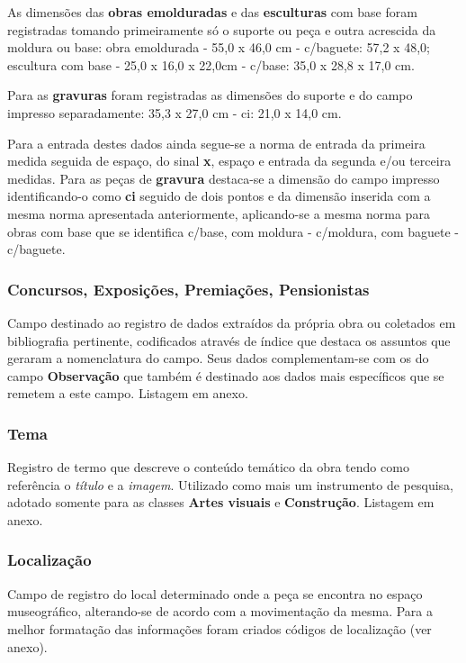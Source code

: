 As dimensões das \textbf{obras emolduradas} e das \textbf{esculturas} com base foram registradas tomando primeiramente só o suporte ou peça e outra acrescida da moldura ou base: obra emoldurada - 55,0 x 46,0 cm - c/baguete: 57,2 x 48,0; escultura com base - 25,0 x 16,0 x 22,0cm - c/base: 35,0 x 28,8 x 17,0 cm. 

Para as \textbf{gravuras} foram registradas as dimensões do suporte e do campo impresso separadamente: 35,3 x 27,0 cm - ci: 21,0 x 14,0 cm. 

Para a entrada destes dados ainda segue-se a norma de entrada da primeira medida seguida de espaço, do sinal \textbf{x}, espaço e entrada da segunda e/ou terceira medidas. Para as peças de \textbf{gravura} destaca-se a dimensão do campo impresso identificando-o como \textbf{ci} seguido de dois pontos e da dimensão inserida com a mesma norma apresentada anteriormente, aplicando-se a mesma norma para obras com base que se identifica c/base, com moldura - c/moldura, com baguete - c/baguete.

\subsubsection{Concursos, Exposições, Premiações, Pensionistas}
Campo destinado ao registro de dados extraídos da própria obra ou coletados em bibliografia pertinente, codificados através de índice que destaca os assuntos que geraram a nomenclatura do campo. Seus dados complementam-se com os do campo \textbf{Observação} que também é destinado aos dados mais específicos que se remetem a este campo. Listagem em anexo.

\subsubsection{Tema}
Registro de termo que descreve o conteúdo temático da obra tendo como referência o \textit{título} e a \textit{imagem}. Utilizado como mais um instrumento de pesquisa, adotado somente para as classes \textbf{Artes visuais} e \textbf{Construção}. Listagem em anexo.

\subsubsection{Localização}
Campo de registro do local determinado onde a peça se encontra no espaço museográfico, alterando-se de acordo com a movimentação da mesma. Para a melhor formatação das informações foram criados códigos de localização (ver anexo).

